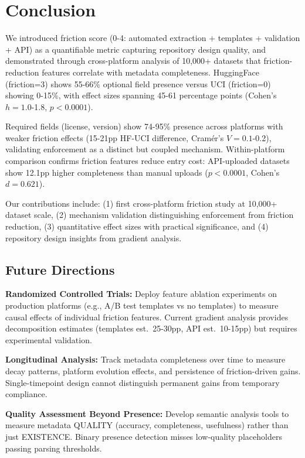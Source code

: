 \section{Conclusion}
\label{sec:conclusion}

We introduced friction score (0-4: automated extraction + templates + validation + API) as a quantifiable metric capturing repository design quality, and demonstrated through cross-platform analysis of 10,000+ datasets that friction-reduction features correlate with metadata completeness. HuggingFace (friction=3) shows 55-66\% optional field presence versus UCI (friction=0) showing 0-15\%, with effect sizes spanning 45-61 percentage points (Cohen's $h=1.0$-1.8, $p<0.0001$).

Required fields (license, version) show 74-95\% presence across platforms with weaker friction effects (15-21pp HF-UCI difference, Cramér's $V=0.1$-0.2), validating enforcement as a distinct but coupled mechanism. Within-platform comparison confirms friction features reduce entry cost: API-uploaded datasets show 12.1pp higher completeness than manual uploads ($p<0.0001$, Cohen's $d=0.621$).

Our contributions include: (1) first cross-platform friction study at 10,000+ dataset scale, (2) mechanism validation distinguishing enforcement from friction reduction, (3) quantitative effect sizes with practical significance, and (4) repository design insights from gradient analysis.

\subsection{Future Directions}

\textbf{Randomized Controlled Trials:} Deploy feature ablation experiments on production platforms (e.g., A/B test templates vs no templates) to measure causal effects of individual friction features. Current gradient analysis provides decomposition estimates (templates est.\ 25-30pp, API est.\ 10-15pp) but requires experimental validation.

\textbf{Longitudinal Analysis:} Track metadata completeness over time to measure decay patterns, platform evolution effects, and persistence of friction-driven gains. Single-timepoint design cannot distinguish permanent gains from temporary compliance.

\textbf{Quality Assessment Beyond Presence:} Develop semantic analysis tools to measure metadata QUALITY (accuracy, completeness, usefulness) rather than just EXISTENCE. Binary presence detection misses low-quality placeholders passing parsing thresholds.

